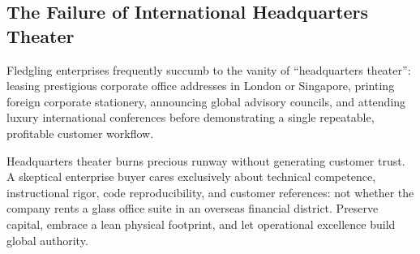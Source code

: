 \subsection{The Failure of International Headquarters Theater}
\label{sec:failure_international_headquarters_theater}

Fledgling enterprises frequently succumb to the vanity of ``headquarters theater'': leasing prestigious corporate office addresses in London or Singapore, printing foreign corporate stationery, announcing global advisory councils, and attending luxury international conferences before demonstrating a single repeatable, profitable customer workflow.

Headquarters theater burns precious runway without generating customer trust. A skeptical enterprise buyer cares exclusively about technical competence, instructional rigor, code reproducibility, and customer references: not whether the company rents a glass office suite in an overseas financial district. Preserve capital, embrace a lean physical footprint, and let operational excellence build global authority.
